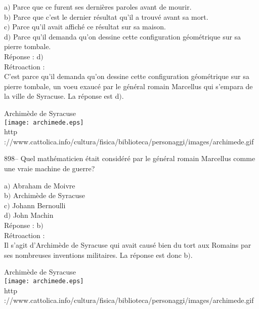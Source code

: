 ﻿\documentclass[letterpaper, 12pt]{article}
\begin{document}
a$)$ Parce que ce furent ses derni\`eres paroles avant de mourir. \\
b$)$ Parce que c'est le dernier r\'esultat qu'il a trouv\'e avant sa mort.
\\
c$)$ Parce qu'il avait affich\'e ce r\'esultat sur sa maison. \\
d$)$ Parce qu'il demanda qu'on dessine cette configuration g\'eom\'etrique
sur sa pierre tombale.\\

R\'eponse : d$)$\\

R\'etroaction : \\
C'est parce qu'il demanda qu'on dessine cette configuration g\'eom\'etrique
sur sa pierre tombale,
un voeu exauc\'e par le g\'en\'eral romain Marcellus qui s'empara de la
ville de Syracuse. La r\'eponse est d$)$.\\

        \begin{center}
        Archim\`ede de Syracuse\\
    \texttt{[image: archimede.eps]}\\
        {\footnotesize http
://www.cattolica.info/cultura/fisica/biblioteca/personaggi/images/archimede.gif}
    \end{center}

898-- Quel math\'ematicien \'etait consid\'er\'e par le g\'en\'eral
romain Marcellus comme une vraie machine de guerre?

a$)$ Abraham de Moivre \\
b$)$ Archim\`ede de Syracuse \\
c$)$ Johann Bernoulli \\
d$)$ John Machin \\

R\'eponse : b$)$\\

R\'etroaction :\\
Il s'agit d'Archim\`ede de Syracuse qui avait caus\'e bien du tort
aux Romains par ses nombreuses inventions
militaires. La r\'eponse est donc b$)$.\\

        \begin{center}
        Archim\`ede de Syracuse\\
    \texttt{[image: archimede.eps]}\\
        {\footnotesize http
://www.cattolica.info/cultura/fisica/biblioteca/personaggi/images/archimede.gif}
    \end{center}
\end{document}
